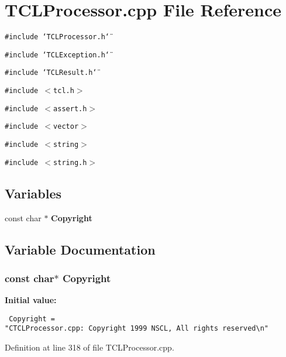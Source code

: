 \section{TCLProcessor.cpp File Reference}
\label{TCLProcessor_8cpp}
{\tt \#include \char`\"{}TCLProcessor.h\char`\"{}}\par
{\tt \#include \char`\"{}TCLException.h\char`\"{}}\par
{\tt \#include \char`\"{}TCLResult.h\char`\"{}}\par
{\tt \#include $<$tcl.h$>$}\par
{\tt \#include $<$assert.h$>$}\par
{\tt \#include $<$vector$>$}\par
{\tt \#include $<$string$>$}\par
{\tt \#include $<$string.h$>$}\par
\subsection*{Variables}
\begin{CompactItemize}
\item 
const char $\ast$ {\bf Copyright}
\end{CompactItemize}


\subsection{Variable Documentation}
\subsubsection{\setlength{\rightskip}{0pt plus 5cm}const char$\ast$ Copyright\hspace{0.3cm}{\tt  [static]}}\label{TCLProcessor_8cpp_a0}


{\bf Initial value:}

\footnotesize\begin{verbatim} Copyright = 
"CTCLProcessor.cpp: Copyright 1999 NSCL, All rights reserved\n"\end{verbatim}\normalsize 


Definition at line 318 of file TCLProcessor.cpp.